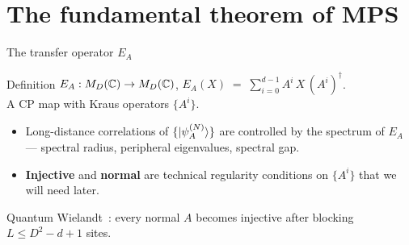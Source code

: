 \documentclass[aspectratio=169,10pt]{beamer}
\begin{document}
\section{The fundamental theorem of MPS}



\begin{frame}{The transfer operator $E_A$}
    \begin{block}{Definition}
        $E_A : M_D(\mathbb{C}) \to M_D(\mathbb{C})$, \quad $E_A(X) \;=\; \sum_{i=0}^{d-1} A^i\, X\, (A^i)^\dagger$.
        \\[2pt]
        A CP map with Kraus operators $\{A^i\}$.
    \end{block}
    \vspace{0.5em}
    \begin{itemize}
        \item Long-distance correlations of $\{\ket{\psi_A^{(N)}}\}$ are controlled by the spectrum of $E_A$ --- spectral radius, peripheral eigenvalues, spectral gap.
        \item \textbf{Injective} and \textbf{normal} are technical regularity conditions on $\{A^i\}$ that we will need later.
    \end{itemize}
    \vspace{0.6em}
    \textcolor{dimwhite}{\footnotesize Quantum Wielandt~\cite{Sanz2010Quantum}: every normal $A$ becomes injective after blocking $L \leq D^2 - d + 1$ sites.}
\end{frame}
\end{document}
